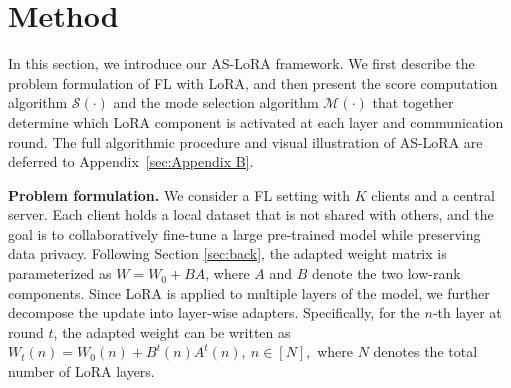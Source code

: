 \vspace{-2mm}

\section{Method}

\vspace{-2mm}

In this section, we introduce our AS-LoRA framework. We first describe the problem formulation of FL with LoRA, and then present the score computation algorithm $\mathcal{S}(\cdot)$ and the mode selection algorithm $\mathcal{M}(\cdot)$ that together determine which LoRA component is activated at each layer and communication round. The full algorithmic procedure and visual illustration of AS-LoRA are deferred to Appendix~\ref{sec:Appendix B}.

\textbf{Problem formulation.}
We consider a FL setting with $K$ clients and a central server. Each client holds a local dataset that is not shared with others, and the goal is to collaboratively fine-tune a large pre-trained model while preserving data privacy. Following Section \ref{sec:back}, the adapted weight matrix is parameterized as \(W = W_0 + BA\), where \(A\) and \(B\) denote the two low-rank components.
Since LoRA is applied to multiple layers of the model, we further decompose the update into layer-wise adapters. Specifically, for the $n$-th layer at round $t$, the adapted weight can be written as
$
W_t(n) = W_0(n) + B^t(n)A^t(n),~ n \in \left[N \right],
$
where $N$ denotes the total number of LoRA layers.


